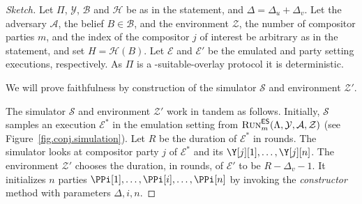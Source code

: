 \begin{proof}[Sketch]
  Let $\Pi$, $\mathcal{Y}$, $\mathcal{B}$ and $\mathcal{H}$
  be as in the statement, and $\Delta = \Delta_u + \Delta_v$.
  Let the adversary $\mathcal{A}$, the belief $B \in \mathcal{B}$,
  and the environment $\mathcal{Z}$, the number of compositor parties $m$,
  and the index of the compositor $j$ of interest be arbitrary
  as in the statement, and set $H = \mathcal{H}(B)$.
  Let $\mathcal{E}$ and $\mathcal{E}'$ be the emulated and party setting
  executions, respectively.
  As $\Pi$ is a \rollerblade-suitable-overlay protocol it is deterministic.

  We will prove faithfulness by
  construction of the simulator $\mathcal{S}$ and environment $\mathcal{Z}'$.

  The simulator $\mathcal{S}$ and environment $\mathcal{Z}'$ work in tandem
  as follows.
  Initially, $\mathcal{S}$ samples an execution
  $\mathcal{E}^*$ in the emulation setting from
  $\textsc{Run}^{\textsf{ES}}_m(\Lambda,\allowbreak\mathcal{Y},\allowbreak\mathcal{A},\allowbreak\mathcal{Z})$
  (see Figure~\ref{fig.conj.simulation}).
  Let $R$ be the duration of $\mathcal{E}^*$ in rounds.
  The simulator looks at compositor party $j$ of $\mathcal{E}^*$
  and its $\Y[j][1], \ldots, \Y[j][n]$.
  The environment $\mathcal{Z}'$ chooses the duration, in rounds, of
  $\mathcal{E}'$ to be $R - \Delta_v - 1$. It initializes $n$
  parties $\PPi[1], \ldots, \PPi[i], \ldots, \PPi[n]$ by invoking
  the \emph{constructor} method with parameters $\Delta, i, n$.


\end{proof}
